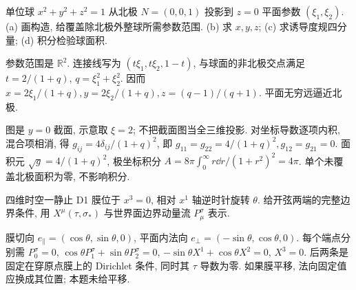 \begin{exercise}
单位球 $x^2+y^2+z^2=1$ 从北极 $N=(0,0,1)$ 投影到 $z=0$ 平面参数 $(\xi_1,\xi_2)$.
(a) 画构造, 给覆盖除北极外整球所需参数范围.
(b) 求 $x,y,z$; (c) 求诱导度规四分量; (d) 积分检验球面积.
\end{exercise}
\begin{solution}
参数范围是 $\mathbb R^2$. 连接线写为 $(t\xi_1,t\xi_2,1-t)$, 与球面的非北极交点满足 $t=2/(1+q)$, $q=\xi_1^2+\xi_2^2$. 因而 $x=2\xi_1/(1+q),y=2\xi_2/(1+q),z=(q-1)/(q+1)$. 平面无穷远逼近北极.
\begin{center}\end{center}
图是 $y=0$ 截面, 示意取 $\xi=2$; 不把截面图当全三维投影. 对坐标导数逐项内积, 混合项相消, 得 $g_{ij}=4\delta_{ij}/(1+q)^2$, 即 $g_{11}=g_{22}=4/(1+q)^2,g_{12}=g_{21}=0$. 面积元 $\sqrt g=4/(1+q)^2$, 极坐标积分 $A=8\pi\int_0^\infty r\dd r/(1+r^2)^2=4\pi$. 单个未覆盖北极面积为零, 不影响积分.
\end{solution}

\begin{exercise}
四维时空一静止 D1 膜位于 $x^3=0$, 相对 $x^1$ 轴逆时针旋转 $\theta$. 给开弦两端的完整边界条件, 用 $X^\mu(\tau,\sigma_*)$ 与世界面边界动量流 $P^\sigma_\mu$ 表示.
\end{exercise}
\begin{solution}
膜切向 $e_\parallel=(\cos\theta,\sin\theta,0)$, 平面内法向 $e_\perp=(-\sin\theta,\cos\theta,0)$. 每个端点分别需 $P^\sigma_0=0$, $\cos\theta P^\sigma_1+\sin\theta P^\sigma_2=0$, $-\sin\theta X^1+\cos\theta X^2=0$, $X^3=0$. 后两条是固定在穿原点膜上的 Dirichlet 条件, 同时其 $\tau$ 导数为零. 如果膜平移, 法向固定值应换成其位置; 本题未给平移.
\end{solution}

